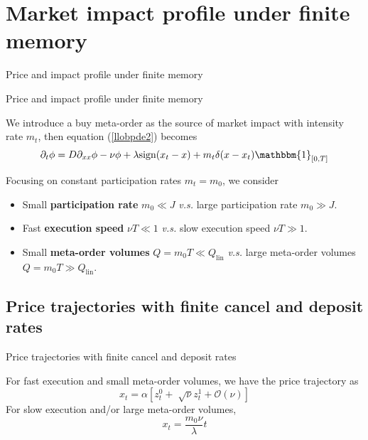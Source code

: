 \documentclass{beamer}
\begin{document}
\section{Market impact profile under finite memory}

\begin{frame}{Price and impact profile under finite memory}
  \tableofcontents[currentsection]
\end{frame}

\begin{frame}{Price and impact profile under finite memory}

We introduce a buy meta-order as the source of market impact with intensity rate $m_t$, then equation (\ref{llobpde2}) becomes
\begin{equation}\label{llobpde3}
\partial_t\phi = D\partial_{xx}\phi-\nu\phi+\lambda\text{sign}(x_t-x)+m_t\delta(x-x_t)\mathbbm{1}_{[0,T]}
\end{equation}

Focusing on constant participation rates $m_t=m_0$, we consider

\begin{itemize}
\item Small \textbf{participation rate} $m_0\ll J$ \textit{v.s.} large participation rate $m_0\gg J$.
\item Fast \textbf{execution speed} $\nu T\ll 1$ \textit{v.s.} slow execution speed $\nu T\gg 1$.
\item Small \textbf{meta-order volumes} $Q=m_0 T\ll Q_\text{lin}$ \textit{v.s.} large meta-order volumes $Q=m_0 T\gg Q_\text{lin}$.
\end{itemize}

\end{frame}

\subsection{Price trajectories with finite cancel and deposit rates}

\begin{frame}{Price trajectories with finite cancel and deposit rates}

For fast execution and small meta-order volumes, we have the price trajectory as
\begin{equation}
x_t=\alpha\left[z_t^0+\sqrt[]{\nu}z_t^1+\mathcal{O}(\nu)\right]
\end{equation}
 \newline
For slow execution and/or large meta-order volumes,
\begin{equation}
x_t=\frac{m_0\nu}{\lambda}t
\end{equation}

\end{frame}
\end{document}
